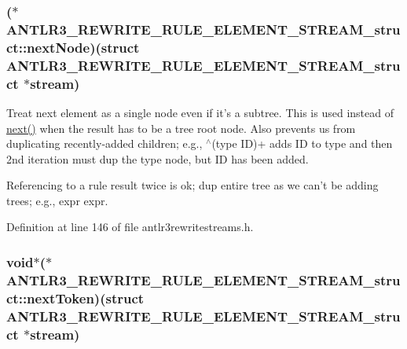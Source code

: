 \hypertarget{struct_a_n_t_l_r3___r_e_w_r_i_t_e___r_u_l_e___e_l_e_m_e_n_t___s_t_r_e_a_m__struct_aecd854145796216efc9c57b3960abfa4}{
\subsubsection[{next\-Node}]{($\ast$ A\-N\-T\-L\-R3\-\_\-\-R\-E\-W\-R\-I\-T\-E\-\_\-\-R\-U\-L\-E\-\_\-\-E\-L\-E\-M\-E\-N\-T\-\_\-\-S\-T\-R\-E\-A\-M\-\_\-struct\-::next\-Node)(struct {\bf A\-N\-T\-L\-R3\-\_\-\-R\-E\-W\-R\-I\-T\-E\-\_\-\-R\-U\-L\-E\-\_\-\-E\-L\-E\-M\-E\-N\-T\-\_\-\-S\-T\-R\-E\-A\-M\-\_\-struct} $\ast$stream)}}\label{struct_a_n_t_l_r3___r_e_w_r_i_t_e___r_u_l_e___e_l_e_m_e_n_t___s_t_r_e_a_m__struct_aecd854145796216efc9c57b3960abfa4}
Treat next element as a single node even if it's a subtree. This is used instead of \hyperlink{struct_a_n_t_l_r3___r_e_w_r_i_t_e___r_u_l_e___e_l_e_m_e_n_t___s_t_r_e_a_m__struct_a49a3d89cea69ba728843b12a5cfd51e3}{next()} when the result has to be a tree root node. Also prevents us from duplicating recently-\/added children; e.\-g., $^\wedge$(type I\-D)+ adds I\-D to type and then 2nd iteration must dup the type node, but I\-D has been added.

Referencing to a rule result twice is ok; dup entire tree as we can't be adding trees; e.\-g., expr expr. 

Definition at line 146 of file antlr3rewritestreams.\-h.

\hypertarget{struct_a_n_t_l_r3___r_e_w_r_i_t_e___r_u_l_e___e_l_e_m_e_n_t___s_t_r_e_a_m__struct_ae68722ecc1e063575e357f87959f23a7}{
\subsubsection[{next\-Token}]{\setlength{\rightskip}{0pt plus 5cm}void$\ast$($\ast$ A\-N\-T\-L\-R3\-\_\-\-R\-E\-W\-R\-I\-T\-E\-\_\-\-R\-U\-L\-E\-\_\-\-E\-L\-E\-M\-E\-N\-T\-\_\-\-S\-T\-R\-E\-A\-M\-\_\-struct\-::next\-Token)(struct {\bf A\-N\-T\-L\-R3\-\_\-\-R\-E\-W\-R\-I\-T\-E\-\_\-\-R\-U\-L\-E\-\_\-\-E\-L\-E\-M\-E\-N\-T\-\_\-\-S\-T\-R\-E\-A\-M\-\_\-struct} $\ast$stream)}}\label{struct_a_n_t_l_r3___r_e_w_r_i_t_e___r_u_l_e___e_l_e_m_e_n_t___s_t_r_e_a_m__struct_ae68722ecc1e063575e357f87959f23a7}


